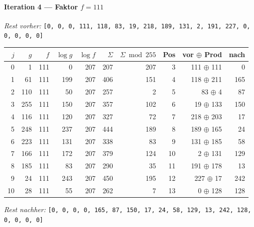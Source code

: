 \paragraph{Iteration 4 — Faktor $f = 111$}
\textit{Rest vorher:} \texttt{[0, 0, 0, 111, 118, 83, 19, 218, 189, 131, 2, 191, 227, 0, 0, 0, 0, 0]}\par
\begin{center}
\footnotesize
\setlength{\tabcolsep}{4pt}
\renewcommand{\arraystretch}{1.1}
\begin{tabular}{r|rr|rrrr|rrr}
\toprule
$j$ & $g$ & $f$ & $\log g$ & $\log f$ & $\Sigma$ & $\Sigma\bmod 255$ & Pos & vor $\oplus$ Prod & nach \\
\midrule
0 & 1 & 111 & 0 & 207 & 207 & 207 & 3 & 111 $\oplus$ 111 & 0 \\
1 & 61 & 111 & 199 & 207 & 406 & 151 & 4 & 118 $\oplus$ 211 & 165 \\
2 & 110 & 111 & 50 & 207 & 257 & 2 & 5 & 83 $\oplus$ 4 & 87 \\
3 & 255 & 111 & 150 & 207 & 357 & 102 & 6 & 19 $\oplus$ 133 & 150 \\
4 & 116 & 111 & 120 & 207 & 327 & 72 & 7 & 218 $\oplus$ 203 & 17 \\
5 & 248 & 111 & 237 & 207 & 444 & 189 & 8 & 189 $\oplus$ 165 & 24 \\
6 & 223 & 111 & 131 & 207 & 338 & 83 & 9 & 131 $\oplus$ 185 & 58 \\
7 & 166 & 111 & 172 & 207 & 379 & 124 & 10 & 2 $\oplus$ 131 & 129 \\
8 & 185 & 111 & 83 & 207 & 290 & 35 & 11 & 191 $\oplus$ 178 & 13 \\
9 & 24 & 111 & 243 & 207 & 450 & 195 & 12 & 227 $\oplus$ 17 & 242 \\
10 & 28 & 111 & 55 & 207 & 262 & 7 & 13 & 0 $\oplus$ 128 & 128 \\
\bottomrule
\end{tabular}
\end{center}
\textit{Rest nachher:} \texttt{[0, 0, 0, 0, 165, 87, 150, 17, 24, 58, 129, 13, 242, 128, 0, 0, 0, 0]}\par\medskip
